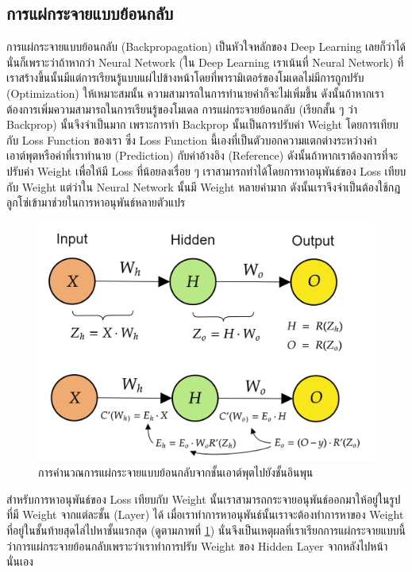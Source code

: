 \subsection{การแผ่กระจายแบบย้อนกลับ}
\label{ssec:backprop}

การแผ่กระจายแบบย้อนกลับ (Backpropagation) เป็นหัวใจหลักของ Deep Learning เลยก็ว่าได้ นั่นก็เพราะว่าถ้าหากว่า Neural Network 
(ใน Deep Learning เราเน้นที่ Neural Network) ที่เราสร้างขึ้นนั้นมีแต่การเรียนรู้แบบแผ่ไปข้างหน้าโดยที่พารามิเตอร์ของโมเดลไม่มีการถูกปรับ
(Optimization) ให้เหมาะสมนั้น ความสามารถในการทำนายค่าก็จะไม่เพิ่มขึ้น ดังนั้นถ้าหากเราต้องการเพิ่มความสามารถในการเรียนรู้ของโมเดล 
การแผ่กระจายย้อนกลับ (เรียกสั้น ๆ ว่า Backprop) นั้นจึงจำเป็นมาก เพราะการทำ Backprop นั้นเป็นการปรับค่า Weight โดยการเทียบกับ Loss
Function ของเรา ซึ่ง Loss Function นี้เองที่เป็นตัวบอกความแตกต่างระหว่างค่าเอาต์พุตหรือค่าที่เราทำนาย (Prediction) กับค่าอ้างอิง 
(Reference) ดังนั้นถ้าหากเราต้องการที่จะปรับค่า Weight เพื่อให้มี Loss ที่น้อยลงเรื่อย ๆ เราสามารถทำได้โดยการหาอนุพันธ์ของ Loss 
เทียบกับ Weight แต่ว่าใน Neural Network นั้นมี Weight หลายค่ามาก ดังนั้นเราจึงจำเป็นต้องใช้กฎลูกโซ่เข้ามาช่วยในการหาอนุพันธ์หลายตัวแปร

\begin{figure}[htbp]
    \centering
    \includegraphics[width=0.8\linewidth]{fig/nn_backprop.png}
    \caption{การคำนวณการแผ่กระจายแบบย้อนกลับจากชั้นเอาต์พุตไปยังชั้นอินพุน}
    \label{fig:nn_bp}
\end{figure}

สำหรับการหาอนุพันธ์ของ Loss เทียบกับ Weight นั้นเราสามารถกระจายอนุพันธ์ออกมาให้อยู่ในรูปที่มี Weight จากแต่ละชั้น (Layer) ได้ 
เมื่อเราทำการหาอนุพันธ์นั้นเราจะต้องทำการหาของ Weight ที่อยู่ในชั้นท้ายสุดไล่ไปหาชั้นแรกสุด (ดูตามภาพที่ \ref{fig:nn_bp})
นั่นจึงเป็นเหตุผลที่เราเรียกการแผ่กระจายแบบนี้ว่าการแผ่กระจายย้อนกลับเพราะว่าเราทำการปรับ Weight ของ Hidden Layer จากหลังไปหน้านั่นเอง

